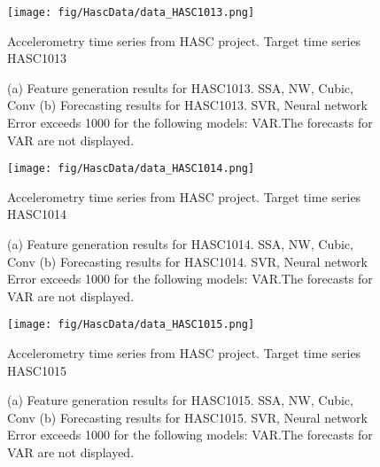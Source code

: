\documentclass[12pt]{article}
\begin{document}
\begin{figure}
\centering
\texttt{[image: fig/HascData/data\_HASC1013.png]}
\caption{Accelerometry time series from HASC project. Target time series	HASC1013	}
\end{figure}


\begin{figure}
\centering
{}
\caption{(a)	Feature generation results for	HASC1013.	SSA, NW, Cubic, Conv	(b)	Forecasting results for	HASC1013.	SVR, Neural network	Error exceeds 1000 for the following models: VAR.The forecasts for VAR are not displayed.	}
\end{figure}


\begin{figure}
\centering
\texttt{[image: fig/HascData/data\_HASC1014.png]}
\caption{Accelerometry time series from HASC project. Target time series	HASC1014	}
\end{figure}


\begin{figure}
\centering
{}
\caption{(a)	Feature generation results for	HASC1014.	SSA, NW, Cubic, Conv	(b)	Forecasting results for	HASC1014.	SVR, Neural network	Error exceeds 1000 for the following models: VAR.The forecasts for VAR are not displayed.	}
\end{figure}


\begin{figure}
\centering
\texttt{[image: fig/HascData/data\_HASC1015.png]}
\caption{Accelerometry time series from HASC project. Target time series	HASC1015	}
\end{figure}


\begin{figure}
\centering
{}
\caption{(a)	Feature generation results for	HASC1015.	SSA, NW, Cubic, Conv	(b)	Forecasting results for	HASC1015.	SVR, Neural network	Error exceeds 1000 for the following models: VAR.The forecasts for VAR are not displayed.	}
\end{figure}
\end{document}
